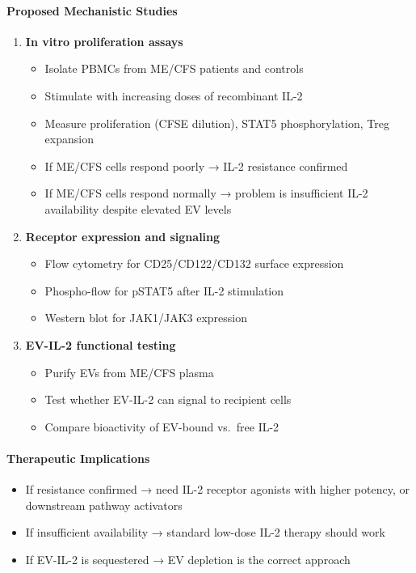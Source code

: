 \paragraph{Proposed Mechanistic Studies}
\begin{enumerate}
    \item \textbf{In vitro proliferation assays}
    \begin{itemize}
        \item Isolate PBMCs from ME/CFS patients and controls
        \item Stimulate with increasing doses of recombinant IL-2
        \item Measure proliferation (CFSE dilution), STAT5 phosphorylation, Treg expansion
        \item If ME/CFS cells respond poorly → IL-2 resistance confirmed
        \item If ME/CFS cells respond normally → problem is insufficient IL-2 availability despite elevated EV levels
    \end{itemize}
    \item \textbf{Receptor expression and signaling}
    \begin{itemize}
        \item Flow cytometry for CD25/CD122/CD132 surface expression
        \item Phospho-flow for pSTAT5 after IL-2 stimulation
        \item Western blot for JAK1/JAK3 expression
    \end{itemize}
    \item \textbf{EV-IL-2 functional testing}
    \begin{itemize}
        \item Purify EVs from ME/CFS plasma
        \item Test whether EV-IL-2 can signal to recipient cells
        \item Compare bioactivity of EV-bound vs.\ free IL-2
    \end{itemize}
\end{enumerate}

\paragraph{Therapeutic Implications}
\begin{itemize}
    \item If resistance confirmed → need IL-2 receptor agonists with higher potency, or downstream pathway activators
    \item If insufficient availability → standard low-dose IL-2 therapy should work
    \item If EV-IL-2 is sequestered → EV depletion is the correct approach
\end{itemize}

